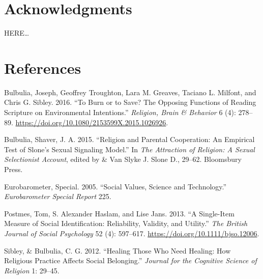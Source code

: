 \documentclass[
  singlecolumn]{report}
\newlength{\cslhangindent}
\newlength{\cslentryspacingunit} %
\newenvironment{CSLReferences}[2] %
 {%
  \setlength{\parindent}{0pt}
  \ifodd #1
  \let\oldpar\par
  \def\par{\hangindent=\cslhangindent\oldpar}
  \fi
  \setlength{\parskip}{#2\cslentryspacingunit}
 }%
 {}
\begin{document}
\hypertarget{acknowledgments}{%
\section{Acknowledgments}\label{acknowledgments}}

HERE\ldots{}

\hypertarget{references}{%
\section{References}\label{references}}

\hypertarget{refs}{}
\begin{CSLReferences}{1}{0}
\leavevmode{}%
Bulbulia, Joseph, Geoffrey Troughton, Lara M. Greaves, Taciano L.
Milfont, and Chris G. Sibley. 2016. {``To Burn or to Save? The Opposing
Functions of Reading Scripture on Environmental Intentions.''}
\emph{Religion, Brain \& Behavior} 6 (4): 278--89.
\url{https://doi.org/10.1080/2153599X.2015.1026926}.

\leavevmode{}%
Bulbulia, Shaver, J. A. 2015. {``Religion and Parental Cooperation: An
Empirical Test of Slone's Sexual Signaling Model.''} In \emph{The
Attraction of Religion: A Sexual Selectionist Account}, edited by \& Van
Slyke J. Slone D., 29--62. Bloomsbury Press.

\leavevmode{}%
Eurobarometer, Special. 2005. {``Social Values, Science and
Technology.''} \emph{Eurobarometer Special Report} 225.

\leavevmode{}%
Postmes, Tom, S. Alexander Haslam, and Lise Jans. 2013. {``A Single-Item
Measure of Social Identification: Reliability, Validity, and Utility.''}
\emph{The British Journal of Social Psychology} 52 (4): 597--617.
\url{https://doi.org/10.1111/bjso.12006}.

\leavevmode{}%
Sibley, \& Bulbulia, C. G. 2012. {``Healing Those Who Need Healing: How
Religious Practice Affects Social Belonging.''} \emph{Journal for the
Cognitive Science of Religion} 1: 29--45.

\end{CSLReferences}
\end{document}
